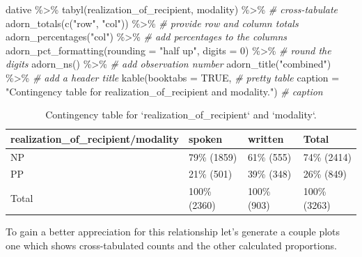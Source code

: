 \documentclass[
]{article}
\newenvironment{Shaded}{\begin{snugshade}}{\end{snugshade}}
\newcommand{\AttributeTok}[1]{\textcolor[rgb]{0.77,0.63,0.00}{#1}}
\newcommand{\CommentTok}[1]{\textcolor[rgb]{0.56,0.35,0.01}{\textit{#1}}}
\newcommand{\ConstantTok}[1]{\textcolor[rgb]{0.00,0.00,0.00}{#1}}
\newcommand{\DecValTok}[1]{\textcolor[rgb]{0.00,0.00,0.81}{#1}}
\newcommand{\FunctionTok}[1]{\textcolor[rgb]{0.00,0.00,0.00}{#1}}
\newcommand{\NormalTok}[1]{#1}
\newcommand{\SpecialCharTok}[1]{\textcolor[rgb]{0.00,0.00,0.00}{#1}}
\newcommand{\StringTok}[1]{\textcolor[rgb]{0.31,0.60,0.02}{#1}}
\begin{document}
\begin{Shaded}
\begin{Highlighting}[]
\NormalTok{dative }\SpecialCharTok{\%\textgreater{}\%} 
  \FunctionTok{tabyl}\NormalTok{(realization\_of\_recipient, modality) }\SpecialCharTok{\%\textgreater{}\%} \CommentTok{\# cross{-}tabulate}
  \FunctionTok{adorn\_totals}\NormalTok{(}\FunctionTok{c}\NormalTok{(}\StringTok{"row"}\NormalTok{, }\StringTok{"col"}\NormalTok{)) }\SpecialCharTok{\%\textgreater{}\%} \CommentTok{\# provide row and column totals}
  \FunctionTok{adorn\_percentages}\NormalTok{(}\StringTok{"col"}\NormalTok{) }\SpecialCharTok{\%\textgreater{}\%} \CommentTok{\# add percentages to the columns}
  \FunctionTok{adorn\_pct\_formatting}\NormalTok{(}\AttributeTok{rounding =} \StringTok{"half up"}\NormalTok{, }\AttributeTok{digits =} \DecValTok{0}\NormalTok{) }\SpecialCharTok{\%\textgreater{}\%} \CommentTok{\# round the digits}
  \FunctionTok{adorn\_ns}\NormalTok{() }\SpecialCharTok{\%\textgreater{}\%} \CommentTok{\# add observation number}
  \FunctionTok{adorn\_title}\NormalTok{(}\StringTok{"combined"}\NormalTok{) }\SpecialCharTok{\%\textgreater{}\%} \CommentTok{\# add a header title}
  \FunctionTok{kable}\NormalTok{(}\AttributeTok{booktabs =} \ConstantTok{TRUE}\NormalTok{, }\CommentTok{\# pretty table}
        \AttributeTok{caption =} \StringTok{"Contingency table for \textasciigrave{}realization\_of\_recipient\textasciigrave{} and \textasciigrave{}modality\textasciigrave{}."}\NormalTok{) }\CommentTok{\# caption}
\end{Highlighting}
\end{Shaded}

\begin{table}

\caption{\label{tab:i-bi-cat-contingency-table}Contingency table for `realization_of_recipient` and `modality`.}
\centering
\begin{tabular}[t]{llll}
\toprule
realization\_of\_recipient/modality & spoken & written & Total\\
\midrule
NP & 79\% (1859) & 61\% (555) & 74\% (2414)\\
PP & 21\%  (501) & 39\% (348) & 26\%  (849)\\
Total & 100\% (2360) & 100\% (903) & 100\% (3263)\\
\bottomrule
\end{tabular}
\end{table}

To gain a better appreciation for this relationship let's generate a couple plots one which shows cross-tabulated counts and the other calculated proportions.
\end{document}
